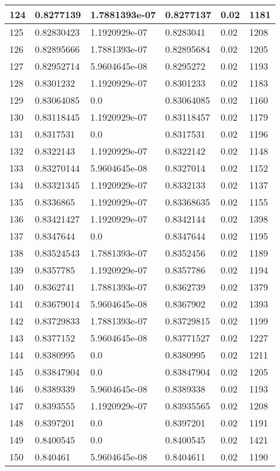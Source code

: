 \begin{longtable}{|l|l|l|l|l|l|}
124 & 0.8277139 & 1.7881393e-07 & 0.8277137 & 0.02 & 1181 \\ \hline 
125 & 0.82830423 & 1.1920929e-07 & 0.8283041 & 0.02 & 1208 \\ \hline 
126 & 0.82895666 & 1.7881393e-07 & 0.82895684 & 0.02 & 1205 \\ \hline 
127 & 0.82952714 & 5.9604645e-08 & 0.8295272 & 0.02 & 1193 \\ \hline 
128 & 0.8301232 & 1.1920929e-07 & 0.8301233 & 0.02 & 1183 \\ \hline 
129 & 0.83064085 & 0.0 & 0.83064085 & 0.02 & 1160 \\ \hline 
130 & 0.83118445 & 1.1920929e-07 & 0.83118457 & 0.02 & 1179 \\ \hline 
131 & 0.8317531 & 0.0 & 0.8317531 & 0.02 & 1196 \\ \hline 
132 & 0.8322143 & 1.1920929e-07 & 0.8322142 & 0.02 & 1148 \\ \hline 
133 & 0.83270144 & 5.9604645e-08 & 0.8327014 & 0.02 & 1152 \\ \hline 
134 & 0.83321345 & 1.1920929e-07 & 0.8332133 & 0.02 & 1137 \\ \hline 
135 & 0.8336865 & 1.1920929e-07 & 0.83368635 & 0.02 & 1155 \\ \hline 
136 & 0.83421427 & 1.1920929e-07 & 0.8342144 & 0.02 & 1398 \\ \hline 
137 & 0.8347644 & 0.0 & 0.8347644 & 0.02 & 1195 \\ \hline 
138 & 0.83524543 & 1.7881393e-07 & 0.8352456 & 0.02 & 1189 \\ \hline 
139 & 0.8357785 & 1.1920929e-07 & 0.8357786 & 0.02 & 1194 \\ \hline 
140 & 0.8362741 & 1.7881393e-07 & 0.8362739 & 0.02 & 1379 \\ \hline 
141 & 0.83679014 & 5.9604645e-08 & 0.8367902 & 0.02 & 1393 \\ \hline 
142 & 0.83729833 & 1.7881393e-07 & 0.83729815 & 0.02 & 1199 \\ \hline 
143 & 0.8377152 & 5.9604645e-08 & 0.83771527 & 0.02 & 1227 \\ \hline 
144 & 0.8380995 & 0.0 & 0.8380995 & 0.02 & 1211 \\ \hline 
145 & 0.83847904 & 0.0 & 0.83847904 & 0.02 & 1205 \\ \hline 
146 & 0.8389339 & 5.9604645e-08 & 0.8389338 & 0.02 & 1193 \\ \hline 
147 & 0.8393555 & 1.1920929e-07 & 0.83935565 & 0.02 & 1208 \\ \hline 
148 & 0.8397201 & 0.0 & 0.8397201 & 0.02 & 1191 \\ \hline 
149 & 0.8400545 & 0.0 & 0.8400545 & 0.02 & 1421 \\ \hline 
150 & 0.840461 & 5.9604645e-08 & 0.8404611 & 0.02 & 1190 \\ \hline 
\end{longtable}